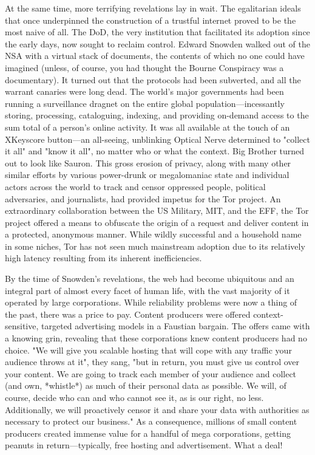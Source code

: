 At the same time, more terrifying revelations lay in wait. The egalitarian ideals that once underpinned the construction of a trustful internet proved to be the most naive of all. The DoD, the very institution that facilitated its adoption since the early days, now sought to reclaim control. Edward Snowden walked out of the NSA with a virtual stack of documents, the contents of which no one could have imagined (unless, of course, you had thought the Bourne Conspiracy was a documentary). It turned out that the protocols had been subverted, and all the warrant canaries were long dead. The world's major governments had been running a surveillance dragnet on the entire global population—incessantly storing, processing, cataloguing, indexing, and providing on-demand access to the sum total of a person's online activity. It was all available at the touch of an XKeyscore button—an all-seeing, unblinking Optical Nerve determined to "collect it all" and "know it all", no matter who or what the context. Big Brother turned out to look like Sauron.
This gross erosion of privacy, along with many other similar efforts by various power-drunk or megalomaniac state and individual actors across the world to track and censor oppressed people, political adversaries, and journalists, had provided impetus for the Tor project. An extraordinary collaboration between the US Military, MIT, and the EFF, the Tor project offered a means to obfuscate the origin of a request and deliver content in a protected, anonymous manner. While wildly successful and a household name in some niches, Tor has not seen much mainstream adoption due to its relatively high latency resulting from its inherent inefficiencies.

By the time of Snowden's revelations, the web had become ubiquitous and an integral part of almost every facet of human life, with the vast majority of it operated by large corporations. While reliability problems were now a thing of the past, there was a price to pay. Content producers were offered context-sensitive, targeted advertising models in a Faustian bargain. The offers came with a knowing grin, revealing that these corporations knew content producers had no choice. "We will give you scalable hosting that will cope with any traffic your audience throws at it", they sang, "but in return, you must give us control over your content. We are going to track each member of your audience and collect (and own, *whistle*) as much of their personal data as possible. We will, of course, decide who can and who cannot see it, as is our right, no less. Additionally, we will proactively censor it and share your data with authorities as necessary to protect our business." As a consequence, millions of small content producers created immense value for a handful of mega corporations, getting peanuts in return---typically, free hosting and advertisement. What a deal!

